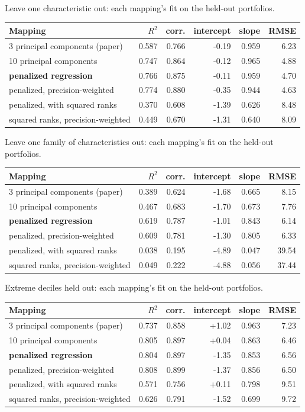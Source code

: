 \documentclass[11pt]{article}
\begin{document}
\begin{tbl}{Leave one characteristic out: each mapping's fit on the held-out portfolios.}
\begin{tabular}{lrrrrr}\toprule
Mapping & $R^2$ & corr. & intercept & slope & RMSE\\\midrule
3 principal components (paper) & 0.587 & 0.766 & -0.19 & 0.959 & 6.23\\
10 principal components & 0.747 & 0.864 & -0.12 & 0.965 & 4.88\\
\bfseries penalized regression & 0.766 & 0.875 & -0.11 & 0.959 & 4.70\\
penalized, precision-weighted & 0.774 & 0.880 & -0.35 & 0.944 & 4.63\\
penalized, with squared ranks & 0.370 & 0.608 & -1.39 & 0.626 & 8.48\\
squared ranks, precision-weighted & 0.449 & 0.670 & -1.31 & 0.640 & 8.09\\
\bottomrule\end{tabular}\end{tbl}
\begin{tbl}{Leave one family of characteristics out: each mapping's fit on the held-out portfolios.}
\begin{tabular}{lrrrrr}\toprule
Mapping & $R^2$ & corr. & intercept & slope & RMSE\\\midrule
3 principal components (paper) & 0.389 & 0.624 & -1.68 & 0.665 & 8.15\\
10 principal components & 0.467 & 0.683 & -1.70 & 0.673 & 7.76\\
\bfseries penalized regression & 0.619 & 0.787 & -1.01 & 0.843 & 6.14\\
penalized, precision-weighted & 0.609 & 0.781 & -1.30 & 0.805 & 6.33\\
penalized, with squared ranks & 0.038 & 0.195 & -4.89 & 0.047 & 39.54\\
squared ranks, precision-weighted & 0.049 & 0.222 & -4.88 & 0.056 & 37.44\\
\bottomrule\end{tabular}\end{tbl}
\begin{tbl}{Extreme deciles held out: each mapping's fit on the held-out portfolios.}
\begin{tabular}{lrrrrr}\toprule
Mapping & $R^2$ & corr. & intercept & slope & RMSE\\\midrule
3 principal components (paper) & 0.737 & 0.858 & +1.02 & 0.963 & 7.23\\
10 principal components & 0.805 & 0.897 & +0.04 & 0.863 & 6.46\\
\bfseries penalized regression & 0.804 & 0.897 & -1.35 & 0.853 & 6.56\\
penalized, precision-weighted & 0.808 & 0.899 & -1.37 & 0.856 & 6.50\\
penalized, with squared ranks & 0.571 & 0.756 & +0.11 & 0.798 & 9.51\\
squared ranks, precision-weighted & 0.626 & 0.791 & -1.52 & 0.699 & 9.72\\
\bottomrule\end{tabular}\end{tbl}
\end{document}
